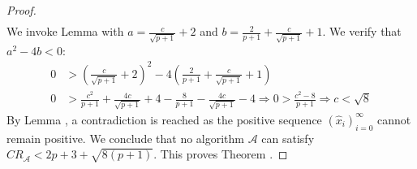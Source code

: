 \begin{proof}
\begin{align*}
  \end{align*}
  We invoke Lemma  with $a=\frac{c}{\sqrt{p+1}}+2$ and $b=\frac{2}{p+1}+\frac{c}{\sqrt{p+1}}+1$. We verify that $a^2-4b<0$:
  \begin{align*}
    0 &> \left(\frac{c}{\sqrt{p+1}}+2\right)^2-4\left(\frac{2}{p+1}+\frac{c}{\sqrt{p+1}}+1\right) \\
    0 &> \frac{c^2}{p+1}+\frac{4c}{\sqrt{p+1}}+4-\frac{8}{p+1}-\frac{4c}{\sqrt{p+1}}-4 \Rightarrow 
    0 > \frac{c^2-8}{p+1} \Rightarrow
    c < \sqrt8
  \end{align*}
  By Lemma , a contradiction is reached as the positive sequence $\left(\hat{x}_i\right)_{i=0}^{\infty}$ cannot remain positive. We conclude that no algorithm $\mathcal{A}$ can satisfy $CR_{\mathcal{A}} < 2p+3+\sqrt{8(p+1)}$. This proves Theorem .
\end{proof}

